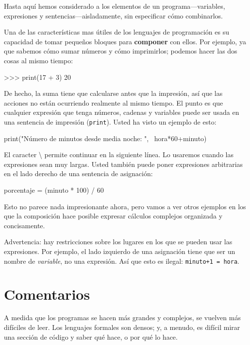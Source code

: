 
Hasta aquí hemos considerado a los elementos de un programa—variables,
expresiones y sentencias—aisladamente, sin especificar cómo combinarlos.

Una de las características mas útiles de los lenguajes de programación
es su capacidad de tomar pequeños bloques para \textbf{componer} con
ellos. Por ejemplo, ya que sabemos cómo sumar números y cómo imprimirlos;
podemos hacer las dos cosas al mismo tiempo:

\begin{pyconcode}
>>> print(17 + 3)
20
\end{pyconcode}
De hecho, la suma tiene que calcularse antes que la impresión, así
que las acciones no están ocurriendo realmente al mismo tiempo. El
punto es que cualquier expresión que tenga números, cadenas y variables
puede ser usada en una sentencia de impresión (\texttt{print}). Usted
ha visto un ejemplo de esto:

\begin{pythoncode}
print("Número de minutos desde media noche: ",  \
  hora*60+minuto)
\end{pythoncode}
El caracter \textbackslash{} permite continuar en la siguiente línea.
Lo usaremos cuando las expresiones sean muy largas. Usted también
puede poner expresiones arbitrarias en el lado derecho de una sentencia
de asignación:

\begin{pythoncode}
porcentaje = (minuto * 100) / 60
\end{pythoncode}
Esto no parece nada impresionante ahora, pero vamos a ver otros ejemplos
en los que la composición hace posible expresar cálculos complejos
organizada y concisamente.

Advertencia: hay restricciones sobre los lugares en los que se pueden
usar las expresiones. Por ejemplo, el lado izquierdo de una asignación
tiene que ser un nombre de {\em variable}, no una expresión. Así
que esto es ilegal: \texttt{minuto+1 = hora}.

\section{Comentarios}


A medida que los programas se hacen más grandes y complejos, se vuelven
más difíciles de leer. Los lenguajes formales son densos; y, a menudo,
es difícil mirar una sección de código y saber qué hace, o por qué
lo hace.

